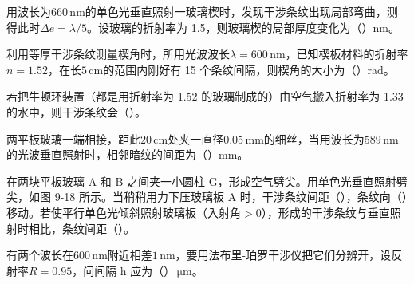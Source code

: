 \documentclass[padl, analysis, notocnum]{ExBook}
\newcommand{\answerarea}[1][3.5cm]{%
  \par\vspace{1mm}%
  \noindent{\color{themeColor!35}\rule{\linewidth}{0.4pt}}\par
  \noindent\begin{minipage}[t][#1][t]{\linewidth}\vspace{0pt}\end{minipage}\par
  \noindent{\color{themeColor!35}\rule{\linewidth}{0.4pt}}\par
}
\begin{document}
\begin{qitems}[startnum=16]
\qitem 用波长为$660\,\mathrm{nm}$的单色光垂直照射一玻璃楔时，发现干涉条纹出现局部弯曲，测得此时$\Delta e=\lambda /5$。设玻璃的折射率为 1.5，则玻璃楔的局部厚度变化为（\hspace{1.6em}）nm。
\label{q:239:start}
\answerarea[4.0cm]
\label{q:239:end}
\end{qitems}

\begin{qitems}[startnum=17]
\qitem 利用等厚干涉条纹测量楔角时，所用光波波长$\lambda =600\,\mathrm{nm}$，已知楔板材料的折射率$n=1.52$，在长$5\,\mathrm{cm}$的范围内刚好有 15 个条纹间隔，则楔角的大小为（\hspace{1.6em}）rad。
\label{q:240:start}
\answerarea[4.0cm]
\label{q:240:end}
\end{qitems}

\begin{qitems}[startnum=18]
\qitem 若把牛顿环装置（都是用折射率为 1.52 的玻璃制成的）由空气搬入折射率为 1.33 的水中，则干涉条纹会（\hspace{1.6em}）。
\label{q:241:start}
\answerarea[4.0cm]
\label{q:241:end}
\end{qitems}

\begin{qitems}[startnum=19]
\qitem 两平板玻璃一端相接，距此$20\,\mathrm{cm}$处夹一直径$0.05\,\mathrm{mm}$的细丝，当用波长为$589\,\mathrm{nm}$的光波垂直照射时，相邻暗纹的间距为（\hspace{1.6em}）mm。
\label{q:242:start}
\answerarea[4.0cm]
\label{q:242:end}
\end{qitems}

\begin{qitems}[startnum=20]
\qitem 在两块平板玻璃 A 和 B 之间夹一小圆柱 G，形成空气劈尖。用单色光垂直照射劈尖，如图 9-18 所示。当稍稍用力下压玻璃板 A 时，干涉条纹间距（\hspace{1.6em}），条纹向（\hspace{1.6em}）移动。若使平行单色光倾斜照射玻璃板（入射角$>0$），形成的干涉条纹与垂直照射时相比，条纹间距（\hspace{1.6em}）。
\label{q:243:start}
\answerarea[1.6cm]
\label{q:243:end}
\end{qitems}

\begin{qitems}[startnum=21]
\qitem 有两个波长在$600\,\mathrm{nm}$附近相差$1\,\mathrm{nm}$，要用法布里-珀罗干涉仪把它们分辨开，设反射率$R=0.95$，问间隔 h 应为（\hspace{1.6em}）$\,\mathrm{\mu m}$。
\label{q:244:start}
\answerarea[1.6cm]
\label{q:244:end}
\end{qitems}
\end{document}
